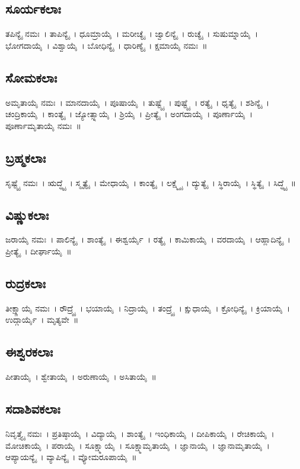\subsection{ಸೂರ್ಯಕಲಾಃ} ತಪಿನ್ಯೈ ನಮಃ~।  ತಾಪಿನ್ಯೈ~।  ಧೂಮ್ರಾಯೈ~।  ಮರೀಚ್ಯೈ~।  ಜ್ವಾಲಿನ್ಯೈ~।  ರುಚ್ಯೈ~।  ಸುಷುಮ್ನಾಯೈ~।  ಭೋಗದಾಯೈ~।  ವಿಶ್ವಾಯೈ~।  ಬೋಧಿನ್ಯೈ~।  ಧಾರಿಣ್ಯೈ~।  ಕ್ಷಮಾಯೈ ನಮಃ~॥
\subsection{ಸೋಮಕಲಾಃ} ಅಮೃತಾಯೈ ನಮಃ~।  ಮಾನದಾಯೈ~।  ಪೂಷಾಯೈ~।  ತುಷ್ಟ್ಯೈ~।  ಪುಷ್ಟ್ಯೈ~।  ರತ್ಯೈ~।  ಧೃತ್ಯೈ~।  ಶಶಿನ್ಯೈ~।  ಚಂದ್ರಿಕಾಯೈ~।  ಕಾಂತ್ಯೈ~।  ಜ್ಯೋತ್ಸ್ನಾಯೈ~।  ಶ್ರಿಯೈ~।  ಪ್ರೀತ್ಯೈ~।  ಅಂಗದಾಯೈ~।  ಪೂರ್ಣಾಯೈ~।  ಪೂರ್ಣಾಮೃತಾಯೈ ನಮಃ~॥
\newpage
\subsection{ಬ್ರಹ್ಮಕಲಾಃ} ಸೃಷ್ಟ್ಯೈ ನಮಃ~।  ಋದ್ಧ್ಯೈ~।  ಸ್ಮೃತ್ಯೈ~।  ಮೇಧಾಯೈ~।  ಕಾಂತ್ಯೈ~।  ಲಕ್ಷ್ಮ್ಯೈ~।  ದ್ಯುತ್ಯೈ~।  ಸ್ಥಿರಾಯೈ~।  ಸ್ಥಿತ್ಯೈ~।  ಸಿದ್ಧ್ಯೈ~॥
\subsection{ವಿಷ್ಣುಕಲಾಃ} ಜರಾಯೈ ನಮಃ~।  ಪಾಲಿನ್ಯೈ~।  ಶಾಂತ್ಯೈ~।  ಈಶ್ವರ್ಯೈ~।  ರತ್ಯೈ~।  ಕಾಮಿಕಾಯೈ~।  ವರದಾಯೈ~।  ಆಹ್ಲಾದಿನ್ಯೈ~।  ಪ್ರೀತ್ಯೈ~।  ದೀರ್ಘಾಯೈ~॥
\subsection{ರುದ್ರಕಲಾಃ} ತೀಕ್ಷ್ಣಾಯೈ ನಮಃ~।  ರೌದ್ರ್ಯೈ~।  ಭಯಾಯೈ~।  ನಿದ್ರಾಯೈ~।  ತಂದ್ರ್ಯೈ~।  ಕ್ಷುಧಾಯೈ~।  ಕ್ರೋಧಿನ್ಯೈ~।  ಕ್ರಿಯಾಯೈ~।  ಉದ್ಗಾರ್ಯೈ~।  ಮೃತ್ಯವೇ~॥
\subsection{ಈಶ್ವರಕಲಾಃ} ಪೀತಾಯೈ~।  ಶ್ವೇತಾಯೈ~।  ಅರುಣಾಯೈ~।  ಅಸಿತಾಯೈ~॥
\subsection{ಸದಾಶಿವಕಲಾಃ} ನಿವೃತ್ತ್ಯೈ ನಮಃ~।  ಪ್ರತಿಷ್ಠಾಯೈ~।  ವಿದ್ಯಾಯೈ~।  ಶಾಂತ್ಯೈ~।  ಇಂಧಿಕಾಯೈ~।  ದೀಪಿಕಾಯೈ~।  ರೇಚಿಕಾಯೈ~।  ಮೋಚಿಕಾಯೈ~।  ಪರಾಯೈ~।  ಸೂಕ್ಷ್ಮಾಯೈ~।  ಸೂಕ್ಷ್ಮಾಮೃತಾಯೈ~।  ಜ್ಞಾನಾಯೈ~।  ಜ್ಞಾನಾಮೃತಾಯೈ~।  ಆಪ್ಯಾಯನ್ಯೈ~।  ವ್ಯಾಪಿನ್ಯೈ~।  ವ್ಯೋಮರೂಪಾಯೈ~॥

